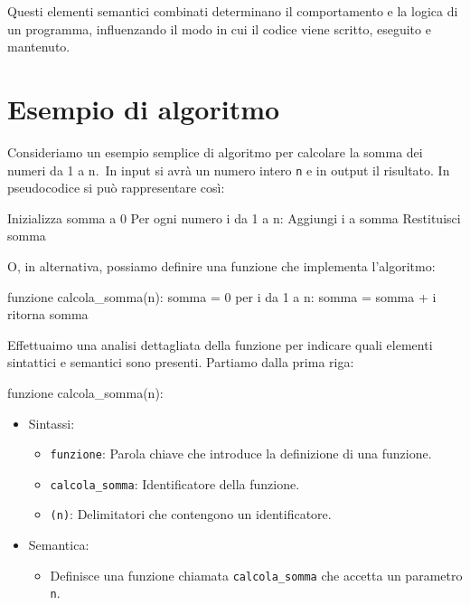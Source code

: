 \documentclass[
  letterpaper,
  DIV=11,
  numbers=noendperiod]{scrreprt}
\newenvironment{Shaded}{\begin{snugshade}}{\end{snugshade}}
\newcommand{\NormalTok}[1]{\textcolor[rgb]{0.00,0.23,0.31}{#1}}
\providecommand{\tightlist}{%
  \setlength{\itemsep}{0pt}\setlength{\parskip}{0pt}}\usepackage{longtable,booktabs,array}
\begin{document}
Questi elementi semantici combinati determinano il comportamento e la
logica di un programma, influenzando il modo in cui il codice viene
scritto, eseguito e mantenuto.

\section{Esempio di algoritmo}\label{esempio-di-algoritmo}

Consideriamo un esempio semplice di algoritmo per calcolare la somma dei
numeri da 1 a n.~In input si avrà un numero intero \texttt{n} e in
output il risultato. In pseudocodice si può rappresentare così:

\begin{Shaded}
\begin{Highlighting}[]
\NormalTok{Inizializza somma a 0}
\NormalTok{Per ogni numero i da 1 a n:}
\NormalTok{  Aggiungi i a somma}
\NormalTok{Restituisci somma}
\end{Highlighting}
\end{Shaded}

O, in alternativa, possiamo definire una funzione che implementa
l'algoritmo:

\begin{Shaded}
\begin{Highlighting}[]
\NormalTok{funzione calcola\_somma(n):}
\NormalTok{  somma = 0}
\NormalTok{  per i da 1 a n:}
\NormalTok{    somma = somma + i}
\NormalTok{  ritorna somma}
\end{Highlighting}
\end{Shaded}

Effettuaimo una analisi dettagliata della funzione per indicare quali
elementi sintattici e semantici sono presenti. Partiamo dalla prima
riga:

\begin{Shaded}
\begin{Highlighting}[]
\NormalTok{funzione calcola\_somma(n):}
\end{Highlighting}
\end{Shaded}

\begin{itemize}
\tightlist
\item
  Sintassi:

  \begin{itemize}
  \tightlist
  \item
    \texttt{funzione}: Parola chiave che introduce la definizione di una
    funzione.
  \item
    \texttt{calcola\_somma}: Identificatore della funzione.
  \item
    \texttt{(n)}: Delimitatori che contengono un identificatore.
  \end{itemize}
\item
  Semantica:

  \begin{itemize}
  \tightlist
  \item
    Definisce una funzione chiamata \texttt{calcola\_somma} che accetta
    un parametro \texttt{n}.
  \end{itemize}
\end{itemize}
\end{document}
